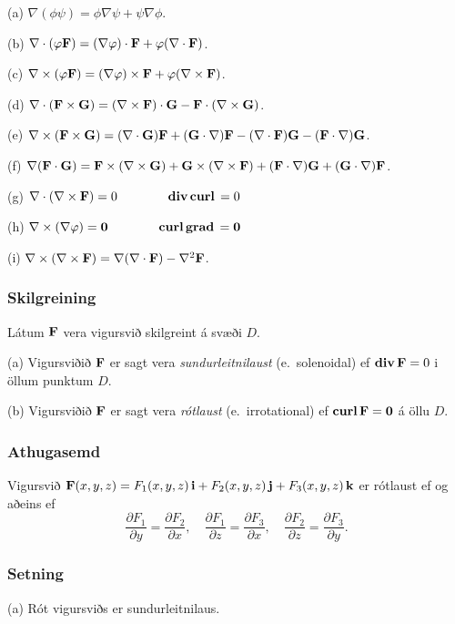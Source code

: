 (a) $\nabla(\phi\psi)=\phi\nabla\psi+\psi\nabla\phi$.

(b)  $\nabla\cdot(\phi\Fv)=(\nabla\phi)\cdot\Fv+\phi(\nabla\cdot\Fv)$.

(c) $\nabla\times(\phi\Fv)=(\nabla\phi)\times\Fv+\phi(\nabla\times\Fv)$. 

(d)  $\nabla\cdot(\Fv\times\Gv)=(\nabla\times\Fv)\cdot\Gv
-\Fv\cdot(\nabla\times\Gv)$.

(e) $\nabla\times(\Fv\times\Gv)=(\nabla\cdot\Gv)\Fv
+(\Gv\cdot\nabla)\Fv-(\nabla\cdot\Fv)\Gv-(\Fv\cdot\nabla)\Gv$.

(f) $\nabla(\Fv\cdot\Gv)=\Fv\times(\nabla\times \Gv)+\Gv\times(\nabla\times \Fv)+(\Fv\cdot\nabla)\Gv+(\Gv\cdot\nabla)\Fv$.

(g) $\nabla\cdot(\nabla\times \Fv)=0\qquad\qquad\dive\curl=0$

(h) $\nabla\times(\nabla\phi)=\ov\qquad\qquad\curl\grad=\ov$

(i)  $\nabla\times(\nabla\times \Fv)=\nabla(\nabla\cdot\Fv)-\nabla^2\Fv$.




\subsubsection{Skilgreining \rtask{}}
 Látum $\Fv$ vera vigursvið skilgreint á svæði $D$.  

(a) Vigursviðið $\Fv$ er sagt vera {\em sundurleitnilaust}
(e.~solenoidal) ef $\dive\Fv=0$ i öllum punktum  $D$.

(b) Vigursviðið $\Fv$ er sagt vera {\em rótlaust} (e.~irrotational) ef $\curl\Fv=\ov$ á öllu $D$.
    


\subsubsection{Athugasemd \rtask{}}
 Vigursvið   $\Fv(x,y,z)=F_1(x,y,z)\,\iv+F_2(x,y,z)\,\jv+F_3(x,y,z)\,\kv$ er rótlaust ef og aðeins ef 
$$\frac{\partial F_1}{\partial y}=
\frac{\partial F_2}{\partial x},\quad
\frac{\partial F_1}{\partial z}=
\frac{\partial F_3}{\partial x},\quad
\frac{\partial F_2}{\partial z}=
\frac{\partial F_3}{\partial y}.$$




\subsubsection{Setning \rtask{}}
 (a) Rót vigursviðs er sundurleitnilaus.


